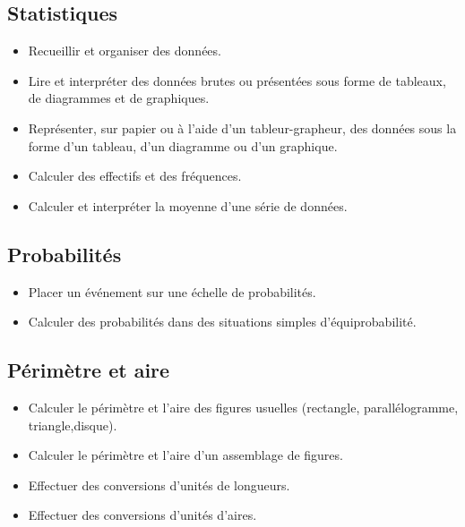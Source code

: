 \documentclass[a4paper,12pt,fleqn]{article}
\begin{document}
\subsection*{Statistiques}

\begin{itemize}[itemsep=1em]
	\item {}Recueillir et organiser des données.
	\item {}Lire et interpréter des données brutes ou présentées sous forme de tableaux, de diagrammes et de graphiques.
	\item {}Représenter, sur papier ou à l’aide d’un tableur-grapheur, des données sous la forme d’un tableau, d’un diagramme ou d’un graphique.
	\item {}Calculer des effectifs et des fréquences.
	\item {}Calculer et interpréter la moyenne d’une série de données.
\end{itemize}

\subsection*{Probabilités}

\begin{itemize}[itemsep=1em]
	\item {}Placer un événement sur une échelle de probabilités.
	\item {}Calculer des probabilités dans des situations simples d’équiprobabilité.
\end{itemize}

\newpage



\subsection*{Périmètre et aire}

\begin{itemize}[itemsep=1em]
	\item {}Calculer le périmètre et l’aire des figures usuelles (rectangle, parallélogramme, triangle,disque).
	\item {}Calculer le périmètre et l’aire d’un assemblage de figures.
	\item {}Effectuer des conversions d’unités de longueurs.
	\item {}Effectuer des conversions d’unités d’aires.
\end{itemize}
\end{document}
